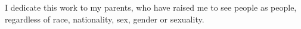 \clearpage
\vspace*{200pt}


\begin{center}
\small I dedicate this work to my parents, who have raised me to see people as people, regardless of race, nationality, sex, gender or sexuality.
\end{center}
